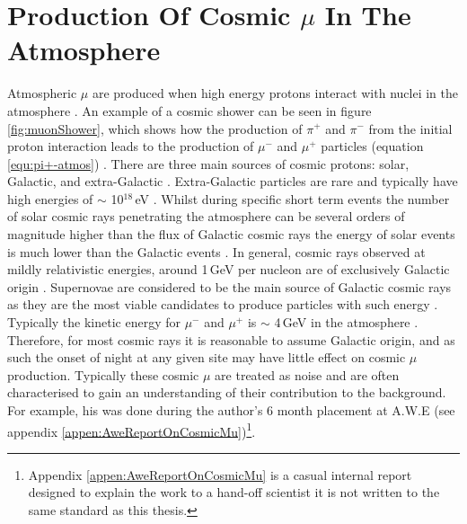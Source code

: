 \section{Production Of Cosmic $\mu$ In The Atmosphere} 
Atmospheric $\mu$ are produced when high energy protons interact with nuclei in the atmosphere \cite{griffiths2008neutrinoOscillations}. An example of a cosmic shower can be seen in figure \ref{fig:muonShower}, which shows how the production of $\pi^+$ and $\pi^-$ from the initial proton interaction leads to the production of $\mu^-$ and $\mu^+$ particles (equation \ref{equ:pi+-atmos}) \cite{griffiths2008neutrinoOscillations}. There are three main sources of cosmic protons: solar, Galactic, and extra-Galactic \cite{Drury2012OCosmicRays} \cite{muscheler2013_10be} \cite{Pierre2017Aniostropy}. Extra-Galactic particles are rare and typically have high energies of $\sim$ 10$^{18}$\,eV \cite{Pierre2017Aniostropy}. Whilst during specific short term events the number of solar cosmic rays penetrating the atmosphere can be several orders of magnitude higher than the flux of Galactic cosmic rays the energy of solar events is much lower than the Galactic events \cite{muscheler2013_10be}. In general, cosmic rays observed at mildly relativistic energies, around 1\,GeV per nucleon are of exclusively Galactic origin \cite{Drury2012OCosmicRays}. Supernovae are considered to be the main source of Galactic cosmic rays as they are the most viable candidates to produce particles with such energy \cite{Drury2012OCosmicRays}. Typically the kinetic energy for $\mu^-$ and $\mu^+$ is $\sim$ 4\,GeV in the atmosphere \cite{MuonPhysics} \cite{ieee_cry_2007}. Therefore, for most cosmic rays it is reasonable to assume Galactic origin, and as such the onset of night at any given site may have little effect on cosmic $\mu$ production. Typically these cosmic $\mu$ are treated as noise and are often characterised to gain an understanding of their contribution to the background. For example, his was done during the author's 6 month placement at A.W.E (see appendix \ref{appen:AweReportOnCosmicMu})\footnote{Appendix \ref{appen:AweReportOnCosmicMu} is a casual internal report designed to explain the work to a hand-off scientist it is not written to the same standard as this thesis.}.


